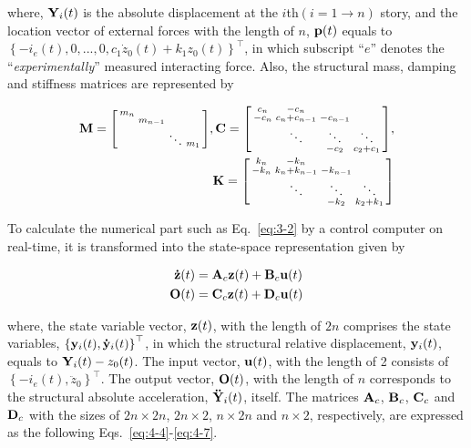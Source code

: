 where, $\mathbf{Y}_{i}(t)$ is the absolute displacement at the $i$th$\left(i=1\rightarrow n\right)$ story, and the location vector of external forces with the length of $n$, $\mathbf{p}(t)$  equals to $\left\{ -i_{e}(t),0,...,0,c_{1}\dot{z}_{0}(t)+k_{1}z_{0}(t)\right\}^{\top}$, in which subscript ``$e$'' denotes the ``\textit{experimentally}'' measured interacting force. Also, the structural mass, damping and stiffness matrices are represented by

\begin{equation}\label{eq:4-2}
\begin{aligned}
\mathbf{M}=\begin{bsmallmatrix}m_{n}&&&\\&m_{n-1}&&\\&&\ddots&m_{1}\end{bsmallmatrix},
\mathbf{C}=\begin{bsmallmatrix}c_{n}&-c_{n}&&\\-c_{n}&c_{n}+c_{n-1}&-c_{n-1}&\\ &\ddots&\ddots&\ddots\\&&-c_{2}&c_{2}+c_{1}\end{bsmallmatrix},\\
\mathbf{K}=\begin{bsmallmatrix}k_{n}&-k_{n}&&\\-k_{n}&k_{n}+k_{n-1}&-k_{n-1}&\\ &\ddots&\ddots&\ddots\\&&-k_{2}&k_{2}+k_{1}\end{bsmallmatrix}
\end{aligned}
\end{equation}

To calculate the numerical part such as Eq.~\eqref{eq:3-2} by a control computer on real-time, it is transformed into the state-space representation given by

\begin{equation}\label{eq:4-3}
\begin{aligned}
\mathbf{\dot{z}}(t)&=\mathbf{A}_{c}\mathbf{z}(t)+\mathbf{B}_{c}\mathbf{u}(t)\\
\mathbf{O}(t)&=\mathbf{C}_{c}\mathbf{z}(t)+\mathbf{D}_{c}\mathbf{u}(t)
\end{aligned}
\end{equation}

where, the state variable vector, $\mathbf{z}(t)$, with the length of $2n$ comprises the state variables, $\left\{\mathbf{y}_{i}(t),\mathbf{\dot{y}}_{i}(t)\right\}^{\top}$, in which the structural relative displacement, $\mathbf{y}_{i}(t)$, equals to $\mathbf{Y}_{i}(t)-z_{0}(t)$. The input vector, $\mathbf{u}(t)$, with the length of 2 consists of $\left\{-i_{e}(t), \ddot{z}_{0}\right\}^{\top}$. The output vector, $\mathbf{O}(t)$, with the length of $n$ corresponds to the structural absolute acceleration, $\mathbf{\ddot{Y}}_{i}(t)$, itself. The matrices $\mathbf{A}_{c}$, $\mathbf{B}_{c}$, $\mathbf{C}_{c}$ and $\mathbf{D}_{c}$ with the sizes of $2n \times 2n$, $2n \times 2$, $n \times 2n$ and $n \times 2$, respectively, are expressed as the following Eqs.~\eqref{eq:4-4}-\eqref{eq:4-7}.

